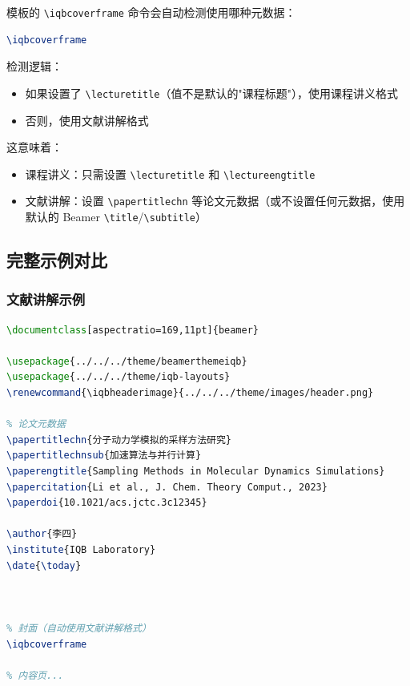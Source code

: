 模板的 \lstinline|\iqbcoverframe| 命令会自动检测使用哪种元数据：

\begin{lstlisting}[style=blockstyle,language=TeX]
% 自动选择封面格式的命令
\iqbcoverframe
\end{lstlisting}

检测逻辑：
\begin{itemize}
  \item 如果设置了 \lstinline|\lecturetitle|（值不是默认的"课程标题"），使用课程讲义格式
  \item 否则，使用文献讲解格式
\end{itemize}

这意味着：
\begin{itemize}
  \item 课程讲义：只需设置 \lstinline|\lecturetitle| 和 \lstinline|\lectureengtitle|
  \item 文献讲解：设置 \lstinline|\papertitlechn| 等论文元数据（或不设置任何元数据，使用默认的 Beamer \lstinline|\title|/\lstinline|\subtitle|）
\end{itemize}

\subsection{完整示例对比}

\subsubsection{文献讲解示例}

\begin{lstlisting}[style=blockstyle,language=TeX]
% !TEX program = xelatex
\documentclass[aspectratio=169,11pt]{beamer}

\usepackage{../../../theme/beamerthemeiqb}
\usepackage{../../../theme/iqb-layouts}
\renewcommand{\iqbheaderimage}{../../../theme/images/header.png}

% 论文元数据
\papertitlechn{分子动力学模拟的采样方法研究}
\papertitlechnsub{加速算法与并行计算}
\paperengtitle{Sampling Methods in Molecular Dynamics Simulations}
\papercitation{Li et al., J. Chem. Theory Comput., 2023}
\paperdoi{10.1021/acs.jctc.3c12345}

\author{李四}
\institute{IQB Laboratory}
\date{\today}



% 封面（自动使用文献讲解格式）
\iqbcoverframe

% 内容页...

\end{lstlisting}

